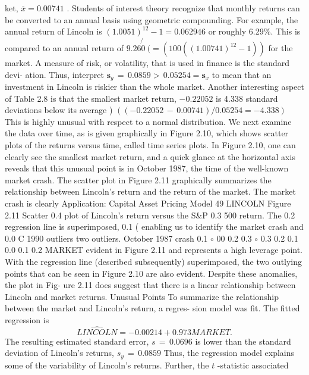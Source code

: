 \documentclass[11pt]{article}
\begin{document}
ket, \(\overline{{x}}=0 . 0 0 7 4 1\) . Students of interest theory recognize that monthly returns can
be converted to an annual basis using geometric compounding. For example,
 the annual return of Lincoln is \(( 1 . 0 0 5 1 )^{1 2}-1=0 . 0 6 2 9 4 6\) or roughly 6.29\%.
This is compared to an annual return of \(9 . 2 6 \not{0} \ (=( 1 0 0 ( ( 1 . 0 0 7 4 1 )^{1 2}-1 ) )\) for the
market. A measure of risk, or volatility, that is used in finance is the standard devi-
ation. Thus, interpret \(\boldsymbol{s}_{y} \,=\, 0 . 0 8 5 9 > \, 0 . 0 5 2 5 4=\boldsymbol{s}_{x}\) to mean that an investment in
Lincoln is riskier than the whole market. Another interesting aspect of Table 2.8
 is that the smallest market return, \(- 0 . 2 2 0 5 2\) is 4.338 standard deviations below
 its average ) \(\left( (-0 . 2 2 0 5 2 \,-\, 0 . 0 0 7 4 1 ) / 0 . 0 5 2 5 4=-4 . 3 3 8 \right)\) This is highly unusual
with respect to a normal distribution.
We next examine the data over time, as is given graphically in Figure 2.10,
which shows scatter plots of the returns versus time, called time series plots. In
Figure 2.10, one can clearly see the smallest market return, and a quick glance at
 the horizontal axis reveals that this unusual point is in October 1987, the time of
 the well-known market crash.
The scatter plot in Figure 2.11 graphically summarizes the relationship
 between Lincoln's return and the return of the market. The market crash is clearly
 Application: Capital Asset Pricing Model 49
LINCOLN Figure 2.11 Scatter
0.4 plot of Lincoln's
return versus the S\&P
0.3 500 return. The
0.2 regression line is
 superimposed,
0.1 ( enabling us to identify
the market crash and
0.0 C 1990 outliers two outliers.
October 1987 crash
0.1 \(\circ\) 00
0.2
0.3 \(\circ\)
0.3 0.2 0.1 0.0 0.1 0.2
MARKET
evident in Figure 2.11 and represents a high leverage point. With the regression
line (described subsequently) superimposed, the two outlying points that can be
seen in Figure 2.10 are also evident. Despite these anomalies, the plot in Fig-
ure 2.11 does suggest that there is a linear relationship between Lincoln and
 market returns.
 Unusual Points
To summarize the relationship between the market and Lincoln's return, a regres-
sion model was fit. The fitted regression is
\[
\widehat{L I N C O L N}=-0 . 0 0 2 1 4+0 . 9 7 3 M A R K E T .
\]
 The resulting estimated standard error, \(s \,=\, 0 . 0 6 9 6\) is lower than the standard
 deviation of Lincoln's returns, \(s_{y} \,=\, 0 . 0 8 5 9\) Thus, the regression model explains
some of the variability of Lincoln's returns. Further, the \(t\) -statistic associated
\end{document}
